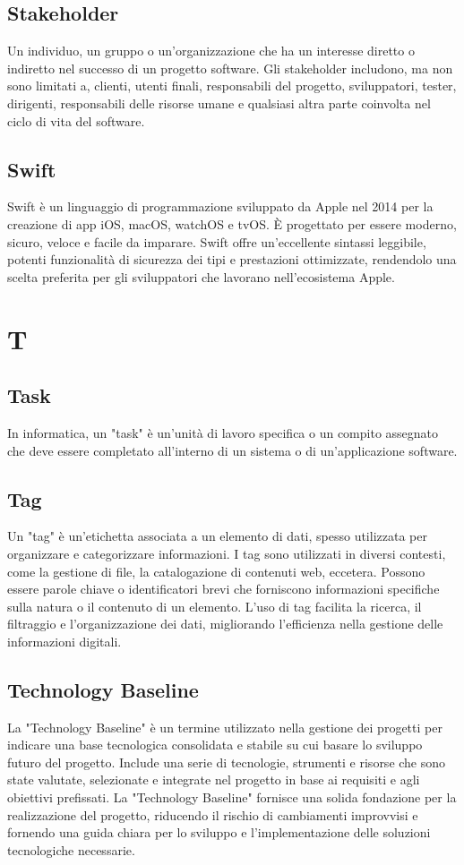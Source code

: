 \documentclass{article}
\begin{document}
\subsection{Stakeholder}
Un individuo, un gruppo o un'organizzazione che ha un interesse diretto o indiretto nel successo di un progetto software. Gli stakeholder includono, ma non sono limitati a, clienti, utenti finali, responsabili del progetto, sviluppatori, tester, dirigenti, responsabili delle risorse umane e qualsiasi altra parte coinvolta nel ciclo di vita del software.

\subsection{Swift}
Swift è un linguaggio di programmazione sviluppato da Apple nel 2014 per la creazione di app iOS, macOS, watchOS e tvOS. È progettato per essere moderno, sicuro, veloce e facile da imparare. Swift offre un'eccellente sintassi leggibile, potenti funzionalità di sicurezza dei tipi e prestazioni ottimizzate, rendendolo una scelta preferita per gli sviluppatori che lavorano nell'ecosistema Apple.

\section{T}
\subsection{Task}
In informatica, un "task" è un'unità di lavoro specifica o un compito assegnato che deve essere completato all'interno di un sistema o di un'applicazione software.

\subsection{Tag}
Un "tag" è un'etichetta associata a un elemento di dati, spesso utilizzata per organizzare e categorizzare informazioni. I tag sono utilizzati in diversi contesti, come la gestione di file, la catalogazione di contenuti web, eccetera. Possono essere parole chiave o identificatori brevi che forniscono informazioni specifiche sulla natura o il contenuto di un elemento. L'uso di tag facilita la ricerca, il filtraggio e l'organizzazione dei dati, migliorando l'efficienza nella gestione delle informazioni digitali.

\subsection{Technology Baseline}
La "Technology Baseline" è un termine utilizzato nella gestione dei progetti per indicare una base tecnologica consolidata e stabile su cui basare lo sviluppo futuro del progetto. Include una serie di tecnologie, strumenti e risorse che sono state valutate, selezionate e integrate nel progetto in base ai requisiti e agli obiettivi prefissati. La "Technology Baseline" fornisce una solida fondazione per la realizzazione del progetto, riducendo il rischio di cambiamenti improvvisi e fornendo una guida chiara per lo sviluppo e l'implementazione delle soluzioni tecnologiche necessarie.
\end{document}
